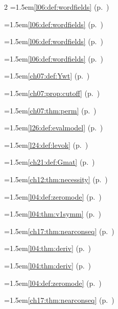 \begin{multicols}{2}
\hangindent=1.5em\quad \ref{l06:def:wordfields} (p.~\pageref{l06:def:wordfields})\par
\hangindent=1.5em\quad \ref{l06:def:wordfields} (p.~\pageref{l06:def:wordfields})\par
\hangindent=1.5em\quad \ref{l06:def:wordfields} (p.~\pageref{l06:def:wordfields})\par
\hangindent=1.5em\quad \ref{l06:def:wordfields} (p.~\pageref{l06:def:wordfields})\par
\hangindent=1.5em\quad \ref{ch07:def:Ywt} (p.~\pageref{ch07:def:Ywt})\par
\hangindent=1.5em\quad \ref{ch07:prop:cutoff} (p.~\pageref{ch07:prop:cutoff})\par
\hangindent=1.5em\quad \ref{ch07:thm:perm} (p.~\pageref{ch07:thm:perm})\par
\par{}\par\nopagebreak\smallskip
\hangindent=1.5em\quad \ref{l26:def:evalmodel} (p.~\pageref{l26:def:evalmodel})\par
\hangindent=1.5em\quad \ref{l24:def:levok} (p.~\pageref{l24:def:levok})\par
\hangindent=1.5em\quad \ref{ch21:def:Gmat} (p.~\pageref{ch21:def:Gmat})\par
\hangindent=1.5em\quad \ref{ch12:thm:necessity} (p.~\pageref{ch12:thm:necessity})\par
\hangindent=1.5em\quad \ref{l04:def:zeromode} (p.~\pageref{l04:def:zeromode})\par
\hangindent=1.5em\quad \ref{l04:thm:v1symm} (p.~\pageref{l04:thm:v1symm})\par
\hangindent=1.5em\quad \ref{ch17:thm:nearconseq} (p.~\pageref{ch17:thm:nearconseq})\par
\hangindent=1.5em\quad \ref{l04:thm:deriv} (p.~\pageref{l04:thm:deriv})\par
\hangindent=1.5em\quad \ref{l04:thm:deriv} (p.~\pageref{l04:thm:deriv})\par
\hangindent=1.5em\quad \ref{l04:def:zeromode} (p.~\pageref{l04:def:zeromode})\par
\hangindent=1.5em\quad \ref{ch17:thm:nearconseq} (p.~\pageref{ch17:thm:nearconseq})\par

\end{multicols}
